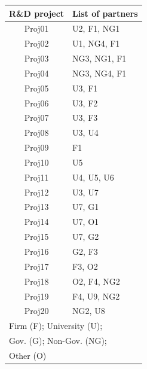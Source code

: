 \documentclass[8pt]{beamer}
\begin{document}
\begin{frame}
\begin{columns}[c]
\centering
\scriptsize
\begin{table}
\begin{tabular}{cl}
\bottomrule
\textbf{R\&D project} & \textbf{List of partners}\\
\hline
Proj01          & U2, F1, NG1\\
Proj02          & U1, NG4, F1\\
Proj03          & NG3, NG1, F1\\
Proj04          & NG3, NG4, F1\\
Proj05          & U3, F1\\
Proj06          & U3, F2\\
Proj07          & U3, F3\\
Proj08          & U3, U4\\
Proj09          & F1\\
Proj10          & U5\\
Proj11          & U4, U5, U6\\
Proj12          & U3, U7\\
Proj13          & U7, G1\\
Proj14          & U7, O1\\
Proj15          & U7, G2\\
Proj16          & G2, F3\\
Proj17          & F3, O2\\
Proj18          & O2, F4, NG2\\
Proj19          & F4, U9, NG2\\
Proj20          & NG2, U8\\
\bottomrule
\multicolumn{2}{l}{\tiny Firm (F); University (U);}\\
\multicolumn{2}{l}{\tiny Gov. (G); Non-Gov. (NG);}\\
\multicolumn{2}{l}{\tiny Other (O)}
\end{tabular}
\end{table}

\end{columns}
   
\end{frame}

\end{document}
